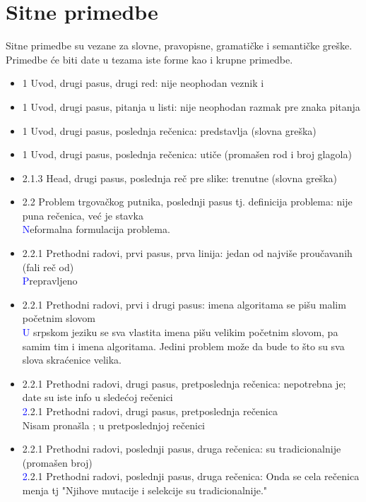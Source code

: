 \documentclass[a4paper]{report}
\newcommand{\odgovor}[1]{\textcolor{blue}{#1}}
\begin{document}
\section{Sitne primedbe}
Sitne primedbe su vezane za slovne, pravopisne, gramatičke i semantičke greške. Primedbe će biti date u tezama iste forme kao i krupne primedbe.
\begin{itemize}
    \item 1 Uvod, drugi pasus, drugi red: nije neophodan veznik i
    \item 1 Uvod, drugi pasus, pitanja u listi: nije neophodan razmak pre znaka pitanja
    \item 1 Uvod, drugi pasus, poslednja rečenica: predstavlja (slovna greška)
    \item 1 Uvod, drugi pasus, poslednja rečenica: utiče (promašen rod i broj glagola)
    \item 2.1.3 Head, drugi pasus, poslednja reč pre slike: trenutne (slovna greška)
    
    \item 2.2 Problem trgovačkog putnika, poslednji pasus tj. definicija problema: nije puna rečenica, već je stavka \\
    \odgovor Neformalna formulacija problema.
    
    \item 2.2.1 Prethodni radovi, prvi pasus, prva linija: jedan od najviše proučavanih (fali reč od)\\
    \odgovor Prepravljeno
    
    \item 2.2.1 Prethodni radovi, prvi i drugi pasus: imena algoritama se pišu malim početnim slovom\\
    \odgovor U srpskom jeziku se sva vlastita imena pišu velikim početnim slovom, pa samim tim i imena algoritama. Jedini problem može da bude to što su sva slova skraćenice velika.
    
    \item 2.2.1 Prethodni radovi, drugi pasus, pretposlednja rečenica: nepotrebna je; date su iste info u sledećoj rečenici\\
    \odgovor 2.2.1 Prethodni radovi, drugi pasus, pretposlednja rečenica \\ Nisam pronašla ; u pretposlednjoj rečenici \\
    
    \item 2.2.1 Prethodni radovi, poslednji pasus, druga rečenica: su tradicionalnije (promašen broj)\\
      \odgovor2.2.1 Prethodni radovi, poslednji pasus, druga rečenica:
      Onda se cela rečenica menja tj "Njihove mutacije i selekcije su tradicionalnije."
    

\end{itemize}
\end{document}
